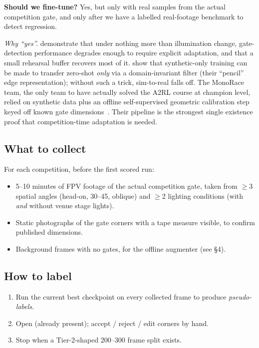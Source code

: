 \documentclass[11pt,a4paper]{article}
\providecommand{\degree}{\textdegree}
\DeclareRobustCommand{\code}[1]{\codeurl{#1}}
\begin{document}
\textbf{Should we fine-tune?} Yes, but only with real samples from the actual competition gate, and only after we have a labelled real-footage benchmark to detect regression.

\textit{Why ``yes''.} \cite{qiao2024continual} demonstrate that under nothing more than illumination change, gate-detection performance degrades enough to require explicit adaptation, and that a small rehearsal buffer recovers most of it. \cite{pham2022pencilnet} show that synthetic-only training can be made to transfer zero-shot \emph{only} via a domain-invariant filter (their ``pencil'' edge representation); without such a trick, sim-to-real falls off. The MonoRace team, the only team to have actually solved the A2RL course at champion level, relied on synthetic data plus an offline self-supervised geometric calibration step keyed off known gate dimensions~\cite{bahnam2026monorace}. Their pipeline is the strongest single existence proof that competition-time adaptation is needed.

\subsection{What to collect}

For each competition, before the first scored run:

\begin{itemize}
  \item 5--10 minutes of FPV footage of the actual competition gate, taken from $\geq$3 spatial angles (head-on, 30--45\degree, oblique) and $\geq$2 lighting conditions (with \emph{and} without venue stage lights).
  \item Static photographs of the gate corners with a tape measure visible, to confirm published dimensions.
  \item Background frames with no gates, for the offline augmenter (see \S4).
\end{itemize}

\subsection{How to label}

\begin{enumerate}
  \item Run the current best checkpoint on every collected frame to produce \emph{pseudo-labels}.
  \item Open \code{scripts/viewer.py} (already present); accept / reject / edit corners by hand.
  \item Stop when a Tier-2-shaped 200--300 frame split exists.
\end{enumerate}
\end{document}
